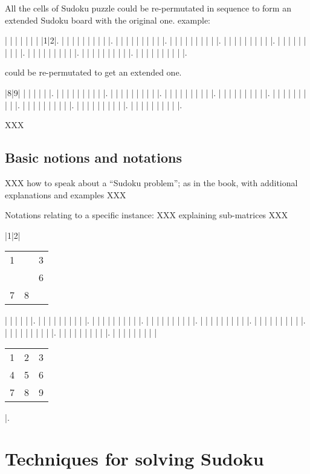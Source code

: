 \documentclass[11pt]{report}
\newcommand{\cell}[9]{%
  \scriptsize
  \setlength{\tabcolsep}{1pt}
  \renewcommand{\arraystretch}{0.5}
  \hspace{-0.6em}
  \begin{tabular}{ccc}
    #1 & #2 & #3\\
    #4 & #5 & #6\\
    #7 & #8 & #9
  \end{tabular}
}
\begin{document}
All the cells of Sudoku puzzle could be re-permutated in sequence to form an extended Sudoku board with the original one.
example:
\begin{sudoku}
   | | | | | | | |1|2|.
   | | | | | | | | | |.
   | | | | | | | | | |.
   | | | | | | | | | |.
   | | | | | | | | | |.
   | | | | | | | | | |.
   | | | | | | | | | |.
   | | | | | | | | | |.
   | | | | | | | | | |.
\end{sudoku}
could be re-permutated to get an extended one.
\begin{sudoku}
\label{p48}
   |8|9| | | | | | |.
   | | | | | | | | | |.
   | | | | | | | | | |.
   | | | | | | | | | |.
   | | | | | | | | | |.
   | | | | | | | | | |.
   | | | | | | | | | |.
   | | | | | | | | | |.
   | | | | | | | | | |.
\end{sudoku}

\cite{Berthier2007Sudoku} XXX





\section{Basic notions and notations}
\label{sec:basicnotnotat}

XXX how to speak about a ``Sudoku problem''; as in the book, with additional explanations and examples XXX

Notations relating to a specific instance: XXX explaining sub-matrices XXX
\begin{sudoku}
\label{p48}
   |1|2|
   {\cell 1{}3{}{}678{} }
   | | | | | |.
   | | | | | | | | | |.
   | | | | | | | | | |.
   | | | | | | | | | |.
   | | | | | | | | | |.
   | | | | | | | | | |.
   | | | | | | | | | |.
   | | | | | | | | | |.
   | | | | | | | | | {\cell 123456789} |.
\end{sudoku}







\chapter{Techniques for solving Sudoku}
\label{sec:Techniques}
\end{document}
